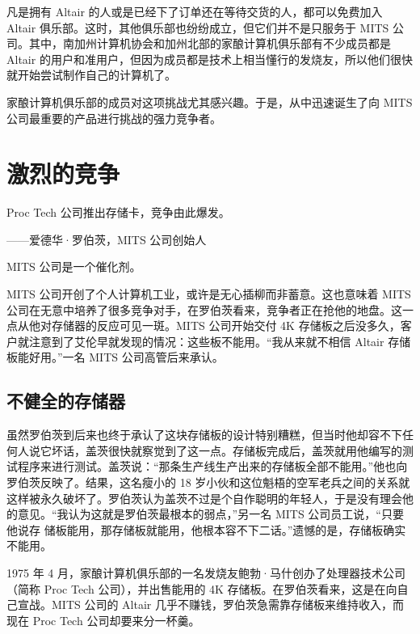 \documentclass[12pt,UTF8]{ctexbook}
\begin{document}
凡是拥有 Altair 的人或是已经下了订单还在等待交货的人，都可以免费加入 Altair 俱乐部。这时，其他俱乐部也纷纷成立，但它们并不是只服务于 MITS 公司。其中，南加州计算机协会和加州北部的家酿计算机俱乐部有不少成员都是 Altair 的用户和准用户，但因为成员都是技术上相当懂行的发烧友，所以他们很快就开始尝试制作自己的计算机了。

家酿计算机俱乐部的成员对这项挑战尤其感兴趣。于是，从中迅速诞生了向 MITS 公司最重要的产品进行挑战的强力竞争者。





\section{激烈的竞争}


Proc Tech 公司推出存储卡，竞争由此爆发。

——爱德华·罗伯茨，MITS 公司创始人



MITS 公司是一个催化剂。

MITS 公司开创了个人计算机工业，或许是无心插柳而非蓄意。这也意味着 MITS 公司在无意中培养了很多竞争对手，在罗伯茨看来，竞争者正在抢他的地盘。这一点从他对存储器的反应可见一斑。MITS 公司开始交付 4K 存储板之后没多久，客户就注意到了艾伦早就发现的情况：这些板不能用。“我从来就不相信 Altair 存储板能好用。”一名 MITS 公司高管后来承认。





\subsection{不健全的存储器}


虽然罗伯茨到后来也终于承认了这块存储板的设计特别糟糕，但当时他却容不下任何人说它坏话，盖茨很快就察觉到了这一点。存储板完成后，盖茨就用他编写的测试程序来进行测试。盖茨说：“那条生产线生产出来的存储板全部不能用。”他也向罗伯茨反映了。结果，这名瘦小的 18 岁小伙和这位魁梧的空军老兵之间的关系就这样被永久破坏了。罗伯茨认为盖茨不过是个自作聪明的年轻人，于是没有理会他的意见。“我认为这就是罗伯茨最根本的弱点，”另一名 MITS 公司员工说，“只要他说存 储板能用，那存储板就能用，他根本容不下二话。”遗憾的是，存储板确实不能用。

1975 年 4 月，家酿计算机俱乐部的一名发烧友鲍勃·马什创办了处理器技术公司（简称 Proc Tech 公司），并出售能用的 4K 存储板。在罗伯茨看来，这是在向自己宣战。MITS 公司的 Altair 几乎不赚钱，罗伯茨急需靠存储板来维持收入，而现在 Proc Tech 公司却要来分一杯羹。
\end{document}
